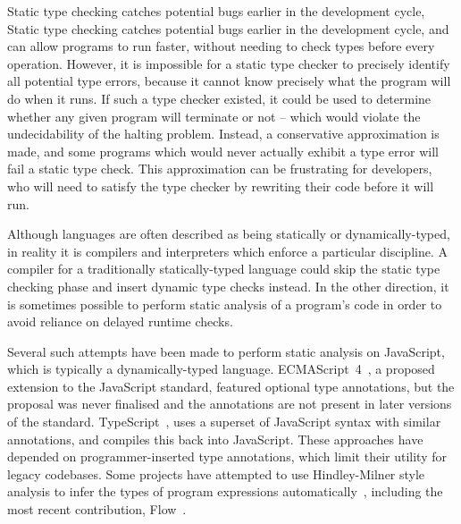 \documentclass[12pt,a4paper,twoside,openright]{report}
\theoremstyle{definition}
\theoremstyle{dotless}
\begin{document}
Static type checking catches potential bugs earlier in the development cycle,
Static type checking catches potential bugs earlier in the development cycle,
and can allow programs to run faster, without needing to check types before
every operation. However, it is impossible for a static type checker to
precisely identify all potential type errors, because it cannot know precisely
what the program will do when it runs. If such a type checker existed, it could
be used to determine whether any given program will terminate or not -- which
would violate the undecidability of the halting problem. Instead, a
conservative approximation is made, and some programs which would never
actually exhibit a type error will fail a static type check. This approximation
can be frustrating for developers, who will need to satisfy the type checker by
rewriting their code before it will run.

Although languages are often described as being statically or
dynamically-typed, in reality it is compilers and interpreters which enforce a
particular discipline. A compiler for a traditionally statically-typed language
could skip the static type checking phase and insert dynamic type checks
instead. In the other direction, it is sometimes possible to perform static
analysis of a program's code in order to avoid reliance on delayed runtime
checks.

Several such attempts have been made to perform static analysis on JavaScript,
which is typically a dynamically-typed language. ECMAScript~4~\cite{es4},
a proposed extension to the JavaScript standard, featured optional type
annotations, but the proposal was never finalised and the annotations are not
present in later versions of the standard. TypeScript~\cite{ts}, uses a
superset of JavaScript syntax with similar annotations, and compiles this back
into JavaScript. These approaches have depended on programmer-inserted type
annotations, which limit their utility for legacy codebases. Some projects
have attempted to use Hindley-Milner style analysis to infer the types of
program expressions automatically~\cite{anderson06, tajs, guha}, including the most
recent contribution, Flow~\cite{flow}. 
\end{document}
